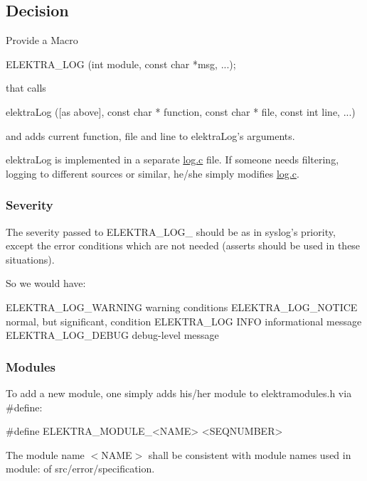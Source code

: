 \subsection*{Decision}

Provide a Macro \begin{DoxyVerb}ELEKTRA_LOG (int module, const char *msg, ...);
\end{DoxyVerb}


that calls \begin{DoxyVerb}elektraLog ([as above], const char * function, const char * file,
        const int line, ...)
\end{DoxyVerb}


and adds current function, file and line to {\ttfamily elektra\+Log}'s arguments.

{\ttfamily elektra\+Log} is implemented in a separate {\ttfamily \hyperlink{log_8c}{log.\+c}} file. If someone needs filtering, logging to different sources or similar, he/she simply modifies {\ttfamily \hyperlink{log_8c}{log.\+c}}.

\subsubsection*{Severity}

The severity passed to {\ttfamily E\+L\+E\+K\+T\+R\+A\+\_\+\+L\+O\+G\+\_\+} should be as in syslog's priority, except the error conditions which are not needed (asserts should be used in these situations).

So we would have\+: \begin{DoxyVerb}    ELEKTRA_LOG_WARNING    warning conditions
    ELEKTRA_LOG_NOTICE     normal, but significant, condition
    ELEKTRA_LOG            INFO    informational message
    ELEKTRA_LOG_DEBUG      debug-level message
\end{DoxyVerb}


\subsubsection*{Modules}

To add a new module, one simply adds his/her module to {\ttfamily elektramodules.\+h} via {\ttfamily \#define}\+: \begin{DoxyVerb}#define ELEKTRA_MODULE_<NAME> <SEQNUMBER>
\end{DoxyVerb}


The module name {\ttfamily $<$N\+A\+M\+E$>$} shall be consistent with module names used in {\ttfamily module\+:} of {\ttfamily src/error/specification}.

